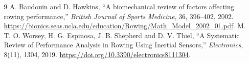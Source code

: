 \documentclass[11pt]{article}
\begin{document}
\begin{thebibliography}{9}
 A. Baudouin and D. Hawkins, ``A biomechanical review of factors affecting rowing performance,'' \emph{British Journal of Sports Medicine}, 36, 396--402, 2002. \url{https://bionics.seas.ucla.edu/education/Rowing/Math_Model_2002_01.pdf}.
 M. T. O. Worsey, H. G. Espinosa, J. B. Shepherd and D. V. Thiel, ``A Systematic Review of Performance Analysis in Rowing Using Inertial Sensors,'' \emph{Electronics}, 8(11), 1304, 2019. \url{https://doi.org/10.3390/electronics8111304}.
\end{thebibliography}
\end{document}

